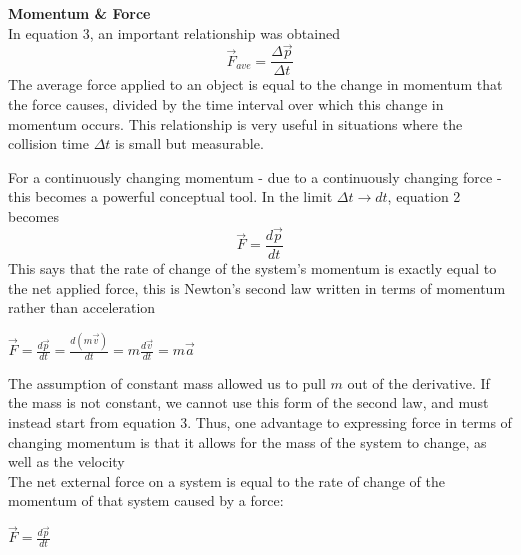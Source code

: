 \documentclass[a4paper]{article}
\let\bf\textbf
\begin{document}
\bf{Momentum \& Force}
\vspace{1mm}\\
In equation 3, an important relationship was obtained
\begin{equation}
    \vec{F}_{ave} = \frac{\Delta\vec{p}}{\Delta t}
\end{equation}
The average force applied to an object is equal to the change in momentum that the force causes, divided by the time interval over which this change in momentum occurs. This relationship is very useful in situations where the collision time $\Delta t$ is small but measurable.

For a continuously changing momentum - due to a continuously changing force - this becomes a powerful conceptual tool. In the limit $\Delta t \to dt$, equation 2 becomes
\begin{equation}
    \vec{F} = \frac{d\vec{p}}{dt}
\end{equation}
This says that the rate of change of the system's momentum is exactly equal to the net applied force, this is Newton's second law written in terms of momentum rather than acceleration
\begin{center}
    $\displaystyle \vec{F} = \frac{d\vec{p}}{dt} = \frac{d(m\vec{v})}{dt} = m\frac{d\vec{v}}{dt} = m\vec{a}$
\end{center}
The assumption of constant mass allowed us to pull $m$ out of the derivative. If the mass is not constant, we cannot use this form of the second law, and must instead start from equation 3. Thus, one advantage to expressing force in terms of changing momentum is that it allows for the mass of the system to change, as well as the velocity
\vspace{1mm}\\
\noindent The net external force on a system is equal to the rate of change of the momentum of that system caused by a force:
\begin{center}
    $\displaystyle \vec{F} = \frac{d\vec{p}}{dt}$
\end{center}
\end{document}
